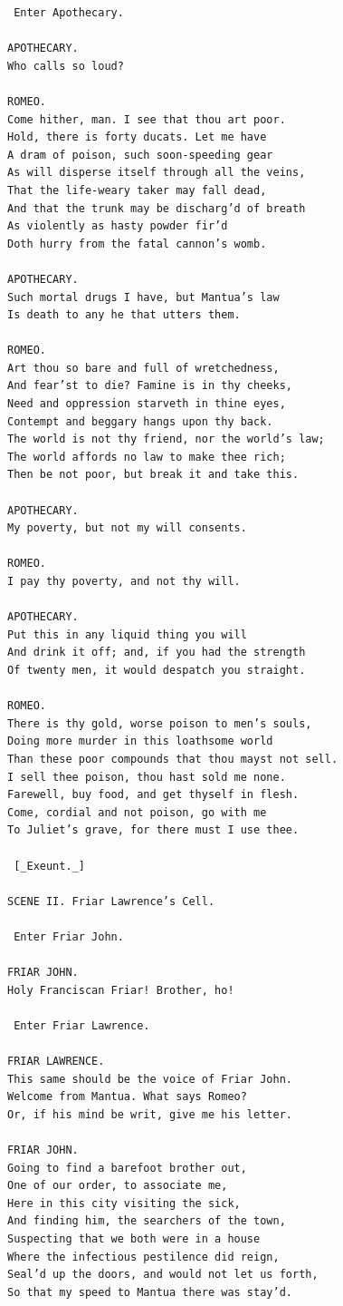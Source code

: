 \documentclass{article}
\begin{document}
\begin{verbatim}
 Enter Apothecary.

APOTHECARY.
Who calls so loud?

ROMEO.
Come hither, man. I see that thou art poor.
Hold, there is forty ducats. Let me have
A dram of poison, such soon-speeding gear
As will disperse itself through all the veins,
That the life-weary taker may fall dead,
And that the trunk may be discharg’d of breath
As violently as hasty powder fir’d
Doth hurry from the fatal cannon’s womb.

APOTHECARY.
Such mortal drugs I have, but Mantua’s law
Is death to any he that utters them.

ROMEO.
Art thou so bare and full of wretchedness,
And fear’st to die? Famine is in thy cheeks,
Need and oppression starveth in thine eyes,
Contempt and beggary hangs upon thy back.
The world is not thy friend, nor the world’s law;
The world affords no law to make thee rich;
Then be not poor, but break it and take this.

APOTHECARY.
My poverty, but not my will consents.

ROMEO.
I pay thy poverty, and not thy will.

APOTHECARY.
Put this in any liquid thing you will
And drink it off; and, if you had the strength
Of twenty men, it would despatch you straight.

ROMEO.
There is thy gold, worse poison to men’s souls,
Doing more murder in this loathsome world
Than these poor compounds that thou mayst not sell.
I sell thee poison, thou hast sold me none.
Farewell, buy food, and get thyself in flesh.
Come, cordial and not poison, go with me
To Juliet’s grave, for there must I use thee.

 [_Exeunt._]

SCENE II. Friar Lawrence’s Cell.

 Enter Friar John.

FRIAR JOHN.
Holy Franciscan Friar! Brother, ho!

 Enter Friar Lawrence.

FRIAR LAWRENCE.
This same should be the voice of Friar John.
Welcome from Mantua. What says Romeo?
Or, if his mind be writ, give me his letter.

FRIAR JOHN.
Going to find a barefoot brother out,
One of our order, to associate me,
Here in this city visiting the sick,
And finding him, the searchers of the town,
Suspecting that we both were in a house
Where the infectious pestilence did reign,
Seal’d up the doors, and would not let us forth,
So that my speed to Mantua there was stay’d.


\end{verbatim}
\end{document}
